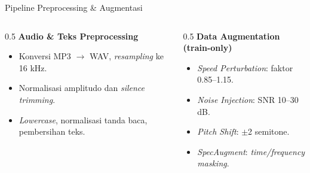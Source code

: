 \begin{frame}{Pipeline Preprocessing \& Augmentasi}
    \begin{columns}[T]
        \begin{column}{0.5\textwidth}
            \textbf{Audio \& Teks Preprocessing}
            \begin{itemize}
                \item Konversi MP3 $\rightarrow$ WAV, \textit{resampling} ke 16 kHz.
                \item Normalisasi amplitudo dan \textit{silence trimming}.
                \item \textit{Lowercase}, normalisasi tanda baca, pembersihan teks.
            \end{itemize}
        \end{column}
        \begin{column}{0.5\textwidth}
            \textbf{Data Augmentation (train-only)}
            \begin{itemize}
                \item \textit{Speed Perturbation}: faktor 0.85--1.15.
                \item \textit{Noise Injection}: SNR 10--30 dB.
                \item \textit{Pitch Shift}: $\pm$2 semitone.
                \item \textit{SpecAugment}: \textit{time/frequency masking}.
            \end{itemize}
        \end{column}
    \end{columns}
\end{frame}